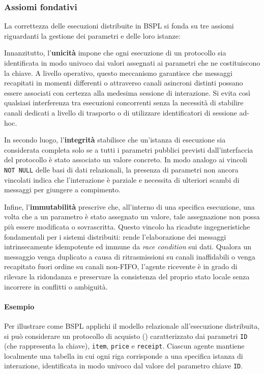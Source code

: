\subsubsection{Assiomi fondativi}\label{bspl:assiomi}

La correttezza delle esecuzioni distribuite in BSPL si fonda su tre 
assiomi riguardanti la gestione dei parametri e delle loro istanze:

Innanzitutto, l'\textbf{unicità} impone che ogni esecuzione di un protocollo sia 
identificata in modo univoco dai valori assegnati ai parametri che ne costituiscono la 
chiave. A livello operativo, questo meccanismo garantisce che messaggi 
recapitati in momenti differenti o attraverso canali asincroni distinti possano essere 
associati con certezza alla medesima sessione di interazione. Si evita così qualsiasi 
interferenza tra esecuzioni concorrenti senza la necessità di stabilire canali dedicati a 
livello di trasporto o di utilizzare identificatori di sessione ad-hoc.

In secondo luogo, l'\textbf{integrità} stabilisce che un'istanza di esecuzione sia 
considerata completa solo se a tutti i parametri pubblici previsti dall'interfaccia 
del protocollo è stato associato un valore concreto. In modo analogo ai vincoli 
\texttt{NOT NULL} delle basi di dati relazionali, la presenza di parametri non ancora 
vincolati indica che l'interazione è parziale e necessita di ulteriori scambi di messaggi 
per giungere a compimento.

Infine, l'\textbf{immutabilità} prescrive che, all'interno di una specifica esecuzione,
una volta che a un parametro è stato assegnato un valore, 
tale assegnazione non possa più essere modificata o sovrascritta. Questo vincolo ha 
ricadute ingegneristiche fondamentali per i sistemi distribuiti: rende l'elaborazione dei 
messaggi intrinsecamente idempotente ed immune da \emph{race condition} sui dati. Qualora 
un messaggio venga duplicato a causa di ritrasmissioni su canali inaffidabili o venga 
recapitato fuori ordine su canali non-FIFO, l'agente ricevente è in grado di rilevare la 
ridondanza e preservare la consistenza del proprio stato locale senza incorrere in conflitti 
o ambiguità.

\paragraph{Esempio}\label{bspl:esempio_modello_relazionale}
Per illustrare come BSPL applichi il modello relazionale all'esecuzione distribuita, 
si può considerare un protocollo di acquisto () caratterizzato dai parametri \texttt{ID}
(che rappresenta la chiave), \texttt{item}, \texttt{price} e \texttt{receipt}.
Ciascun agente mantiene localmente una tabella in cui ogni riga corrisponde a una specifica istanza
di interazione, identificata in modo univoco dal valore del parametro chiave \texttt{ID}.

